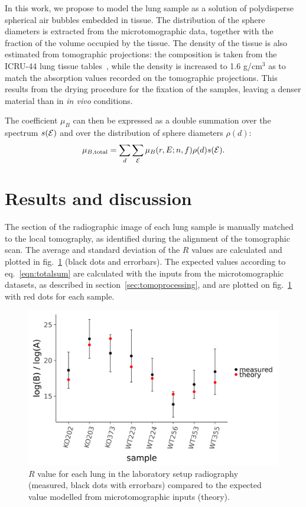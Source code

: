 In this work, we propose to model the lung sample as a solution of
polydisperse spherical air bubbles embedded in tissue. The distribution of
the sphere diameters is extracted from the microtomographic data, together
with the fraction of the volume occupied by the tissue. The density of the
tissue is also estimated from tomographic projections: the composition is
taken from the ICRU-44 lung tissue tables~\parencite{White_1989}, while the density is increased to
1.6 g/cm$^3$ as to match the absorption values recorded on the tomographic
projections. This results from the drying procedure for the fixation of
the samples, leaving a denser material than in \emph{in vivo} conditions.

The coefficient $\mu_B$ can then be expressed as a double summation over the spectrum
$s(\mathcal{E})$ and over the distribution of sphere diameters $\rho(d)$:
\begin{equation}
    \mu_{B,\text{total}} = \sum_{d}\sum_{\mathcal{E}} \mu_B(r, E; n, f)\rho(d)s(\mathcal{E})
    \label{eqn:totalsum}.
\end{equation}


\section{Results and discussion}\label{sec:results}
The section of the radiographic image of each lung sample is manually
matched to the local tomography, as identified during the alignment of the
tomographic scan. The average and standard deviation of the $R$ values are
calculated and plotted in fig.~\ref{206272} (black dots and errorbars). The expected
values according to eq.~\ref{eqn:totalsum} are calculated with the inputs from the
microtomographic datasets, as described in section~\ref{sec:tomoprocessing}, and are plotted on
fig.~\ref{206272} with red dots for each sample.
\begin{figure}[h!]
\begin{center}
\includegraphics[width=0.70\columnwidth]{gfx/lung-paper-figures/samples/samples}
\caption{{\(R\) value for each lung in the laboratory setup
radiography (measured, black dots with errorbars) compared to the
expected value modelled from microtomographic inputs (theory).
{\label{206272}}%
}}
\end{center}
\end{figure}


